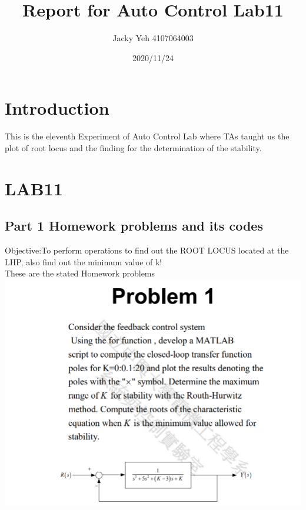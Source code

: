 \documentclass[12pt]{article}
\title{Report for Auto Control Lab11}
\date{2020/11/24}
\author{Jacky Yeh 4107064003}
\begin{document}
\begin{titlepage}

\maketitle
\end{titlepage}


\section{Introduction}
This is the eleventh Experiment of Auto Control Lab where TAs taught us the plot of root locus and the finding for the determination of the stability.


\section{LAB11}
\subsection{Part 1 Homework problems and its codes}
Objective:To perform operations to find out the ROOT LOCUS located at the LHP, also find out the minimum value of k!\\

These are the stated Homework problems\\

\includegraphics[scale=0.6]{Problem1.png} \\

\cleardoublepage
\end{document}

